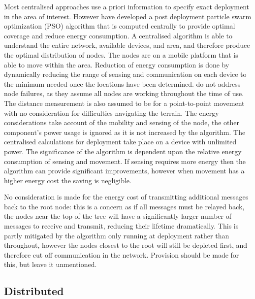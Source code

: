 \documentclass[authoryearcitations]{UoYCSproject}
\begin{document}
%

Most centralised approaches use a priori information to specify exact deployment in the area of interest. However \citet*{Qu2012} have developed a post deployment particle swarm optimization (PSO) algorithm that is computed centrally to provide optimal coverage and reduce energy consumption. A centralised algorithm is able to understand the entire network, available devices, and area, and therefore produce the optimal distribution of nodes. The nodes are on a mobile platform that is able to move within the area. Reduction of energy consumption is done by dynamically reducing the range of sensing and communication on each device to the minimum needed once the locations have been determined. \citeauthor*{Qu2012} do not address node failures, as they assume all nodes are working throughout the time of use. The distance measurement is also assumed to be for a point-to-point movement with no consideration for difficulties navigating the terrain. The energy considerations take account of the mobility and sensing of the node, the other component's power usage is ignored as it is not increased by the algorithm. The centralised calculations for deployment take place on a device with unlimited power. The significance of the algorithm is dependent upon the relative energy consumption of sensing and movement. If sensing requires more energy then the algorithm can provide significant improvements, however when movement has a higher energy cost the saving is negligible.

No consideration is made for the energy cost of transmitting additional messages back to the root node: this is a concern as if all messages must be relayed back, the nodes near the top of the tree will have a significantly larger number of messages to receive and transmit, reducing their lifetime dramatically. This is partly mitigated by the algorithm only running at deployment rather than throughout, however the nodes closest to the root will still be depleted first, and therefore cut off communication in the network. Provision should be made for this, but \citeauthor*{Qu2012} leave it unmentioned.

%
%

\subsection{Distributed}
\end{document}
